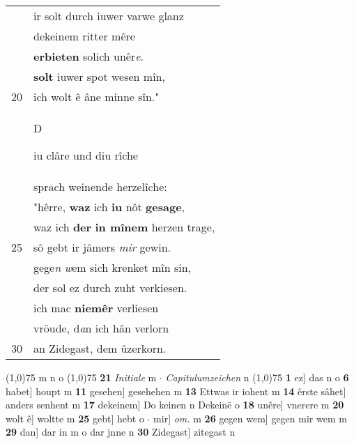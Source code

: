 \documentclass[8pt,a4paper,notitlepage]{article}
\begin{document}
\begin{table}[ht]
\begin{minipage}[t]{0.5\linewidth}
\begin{tabular}{rl}
 & ir solt durch iuwer varwe glanz\\ 
 & dekeinem ritter mêre\\ 
 & \textbf{erbieten} solich unêr\textit{e}.\\ 
 & \textbf{solt} iuwer spot wesen mîn,\\ 
20 & ich wolt ê âne minne sîn."\\ 
 & \begin{large}D\end{large}iu clâre und diu rîche\\ 
 & sprach weinende herzelîche:\\ 
 & "hêrre, \textbf{waz} ich \textbf{iu} nôt \textbf{gesage},\\ 
 & waz ich \textbf{der} \textbf{in mînem} herzen trage,\\ 
25 & sô gebt ir jâmers \textit{mir} gewin.\\ 
 & gege\textit{n} \textit{w}em sich krenket mîn sin,\\ 
 & der sol ez durch zuht verkiesen.\\ 
 & ich mac \textbf{niemêr} verliesen\\ 
 & vröude, d\textit{a}n ich hân verlorn\\ 
30 & an Zidegast, dem ûzerkorn.\\ 
\end{tabular}
\scriptsize
\line(1,0){75} \newline
m n o \newline
\line(1,0){75} \newline
\textbf{21} \textit{Initiale} m   $\cdot$ \textit{Capitulumzeichen} n  \newline
\line(1,0){75} \newline
\textbf{1} ez] das n o \textbf{6} habet] houpt m \textbf{11} gesehen] gesehehen m \textbf{13} Ettwas ir iohent m \textbf{14} êrste sâhet] anders senhent m \textbf{17} dekeinem] Do keinen n Dekeinē o \textbf{18} unêre] vnerere m \textbf{20} wolt ê] woltte m \textbf{25} gebt] hebt o  $\cdot$ mir] \textit{om.} m \textbf{26} gegen wem] gegen mir wem m \textbf{29} dan] dar in m o dar jnne n \textbf{30} Zidegast] zitegast n \newline
\end{minipage}
\end{table}
\newpage
\end{document}
